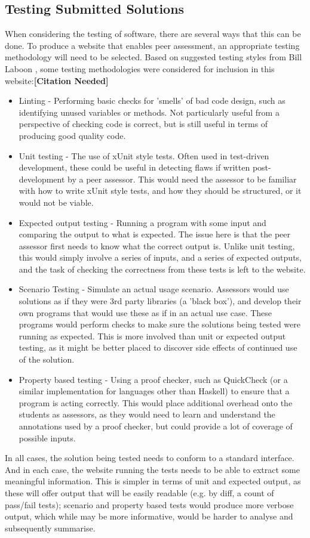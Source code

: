\documentclass[a4paper,11pt]{report}
\newcommand{\cn}{\textbf{[Citation Needed]}}
\begin{document}
\subsection{Testing Submitted Solutions}
When considering the testing of software, there are several ways that this can be done. To produce a website that enables peer assessment, an appropriate testing methodology will need to be selected. Based on suggested testing styles from Bill Laboon \cite{laboon_friendly_2016}, some testing methodologies were considered for inclusion in this website:\cn
\begin{itemize}
 \item Linting - Performing basic checks for 'smells' of bad code design, such as identifying unused variables or methods. Not particularly useful from a perspective of checking code is correct, but is still useful in terms of producing good quality code.
 \item Unit testing - The use of xUnit style tests. Often used in test-driven development, these could be useful in detecting flaws if written post-development by a peer assessor. This would need the assessor to be familiar with how to write xUnit style tests, and how they should be structured, or it would not be viable.
 \item Expected output testing - Running a program with some input and comparing the output to what is expected. The issue here is that the peer assessor first needs to know what the correct output is. Unlike unit testing, this would simply involve a series of inputs, and a series of expected outputs, and the task of checking the correctness from these tests is left to the website.
 \item Scenario Testing - Simulate an actual usage scenario. Assessors would use solutions as if they were 3rd party libraries (a 'black box'), and develop their own programs that would use these as if in an actual use case. These programs would perform checks to make sure the solutions being tested were running as expected. This is more involved than unit or expected output testing, as it might be better placed to discover side effects of continued use of the solution.
 \item Property based testing - Using a proof checker, such as QuickCheck (or a similar implementation for languages other than Haskell) to ensure that a program is acting correctly. This would place additional overhead onto the students as assessors, as they would need to learn and understand the annotations used by a proof checker, but could provide a lot of coverage of possible inputs.
\end{itemize}
In all cases, the solution being tested needs to conform to a standard interface. And in each case, the website running the tests needs to be able to extract some meaningful information. This is simpler in terms of unit and expected output, as these will offer output that will be easily readable (e.g. by diff, a count of pass/fail tests); scenario and property based tests would produce more verbose output, which while may be more informative, would be harder to analyse and subsequently summarise. 
\end{document}
